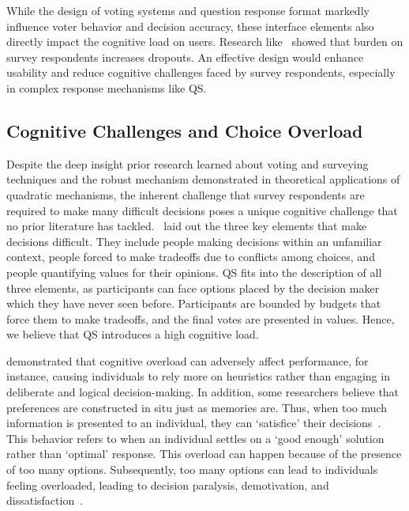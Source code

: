 While the design of voting systems and question response format markedly influence voter behavior and decision accuracy, these interface elements also directly impact the cognitive load on users. Research like~\textcite{galesicDropoutsWebEffects2006} showed that burden on survey respondents increases dropouts. An effective design would enhance usability and reduce cognitive challenges faced by survey respondents, especially in complex response mechanisms like QS.

\subsection{Cognitive Challenges and Choice Overload}
Despite the deep insight prior research learned about voting and surveying techniques and the robust mechanism demonstrated in theoretical applications of quadratic mechanisms, the inherent challenge that survey respondents are required to make many difficult decisions poses a unique cognitive challenge that no prior literature has tackled.~\textcite{lichtensteinConstructionPreference2006} laid out the three key elements that make decisions difficult. They include people making decisions within an unfamiliar context, people forced to make tradeoffs due to conflicts among choices, and people quantifying values for their opinions. QS fits into the description of all three elements, as participants can face options placed by the decision maker which they have never seen before. Participants are bounded by budgets that force them to make tradeoffs, and the final votes are presented in values. Hence, we believe that QS introduces a high cognitive load.

\textcite{daniel2017thinking} demonstrated that cognitive overload can adversely affect performance, for instance, causing individuals to rely more on heuristics rather than engaging in deliberate and logical decision-making. In addition, some researchers believe that preferences are constructed in situ just as memories are. Thus, when too much information is presented to an individual, they can `satisfice' their decisions~\cite{simonBehavioralModelRational1955, payneAdaptiveStrategySelection1988, tverskyJudgmentsRepresentativeness}. This behavior refers to when an individual settles on a `good enough' solution rather than `optimal' response. This overload can happen because of the presence of too many options. Subsequently, too many options can lead to individuals feeling overloaded, leading to decision paralysis, demotivation, and dissatisfaction~\cite{iyengarWhenChoiceDemotivating2000}.

